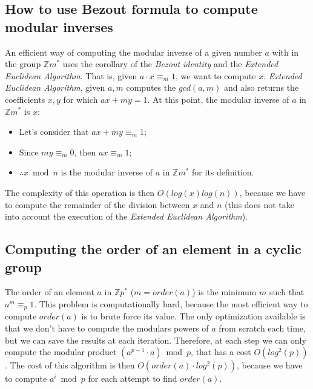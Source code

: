 \documentclass[12pt, a4paper, english]{report}
\begin{document}
\subsection{How to use Bezout formula to compute modular inverses}
An efficient way of computing the modular inverse of a given number $a$ with in the group $\mathbb{Z}{m}^{*}$ uses the corollary of the \emph{Bezout identity} and the \emph{Extended Euclidean Algorithm}.\newline
That is, given $a \cdot x \equiv_{m} 1$, we want to compute $x$.\newline
\emph{Extended Euclidean Algorithm}, given $a, m$ computes the $gcd(a,m)$ and also returns the coefficients $x,y$ for which $ax + my = 1$. \newline
At this point, the modular inverse of $a$ in $\mathbb{Z}{m}^{*}$ is $x$:
\begin{itemize}
    \item Let's consider that $ax + my \equiv_{m} 1$;
    \item Since $my \equiv_{m} 0$, then $ax \equiv_{m} 1$;
    \item $\therefore x \bmod n$ is the modular inverse of $a$ in $\mathbb{Z}{m}^{*}$ for its definition.
\end{itemize}
The complexity of this operation is then $O(log(x)log(n))$, because we have to compute the remainder of the division between $x$ and $n$ (this does not take into account the execution of the \emph{Extended Euclidean Algorithm}).

\subsection{Computing the order of an element in a cyclic group}
The order of an element $a$ in $\mathbb{Z}{p}^{*}$ ($m = order(a)$) is the minimum $m$ such that $a^{m} \equiv_{p} 1$.\newline
This problem is computationally hard, because the most efficient way to compute $order(a)$ is to brute force its value.\newline
The only optimization available is that we don't have to compute the modulars powers of $a$ from scratch each time, but we can save the results at each iteration. Therefore, at each step we can only compute the modular product $(a^{p-1} \cdot a) \bmod p$, that has a cost $O(log^{2}(p))$.
The cost of this algorithm is then $O(order(a) \cdot log^{2}(p))$, because we have to compute $a^{i} \bmod p$ for each attempt to find $order(a)$.
\end{document}

